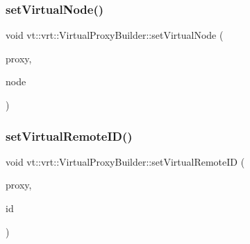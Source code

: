 \mbox{\label{structvt_1_1vrt_1_1_virtual_proxy_builder_a9d86ac5516ac3617501680ce2c6e28c0}} 
\subsubsection{\texorpdfstring{set\+Virtual\+Node()}{setVirtualNode()}}
{\footnotesize\ttfamily void vt\+::vrt\+::\+Virtual\+Proxy\+Builder\+::set\+Virtual\+Node (\begin{DoxyParamCaption}\item[{\hyperlink{namespacevt_a1b417dd5d684f045bb58a0ede70045ac}{Virtual\+Proxy\+Type} \&}]{proxy,  }\item[{\hyperlink{namespacevt_a866da9d0efc19c0a1ce79e9e492f47e2}{Node\+Type} const \&}]{node }\end{DoxyParamCaption})\hspace{0.3cm}{\ttfamily [static]}}

\mbox{\label{structvt_1_1vrt_1_1_virtual_proxy_builder_a531eb058c08a809d6266533e4ed597ba}} 
\subsubsection{\texorpdfstring{set\+Virtual\+Remote\+I\+D()}{setVirtualRemoteID()}}
{\footnotesize\ttfamily void vt\+::vrt\+::\+Virtual\+Proxy\+Builder\+::set\+Virtual\+Remote\+ID (\begin{DoxyParamCaption}\item[{\hyperlink{namespacevt_a1b417dd5d684f045bb58a0ede70045ac}{Virtual\+Proxy\+Type} \&}]{proxy,  }\item[{\hyperlink{namespacevt_1_1vrt_a8184ab8c530ce523edcdc4f4c38565be}{Virtual\+Remote\+I\+D\+Type} const \&}]{id }\end{DoxyParamCaption})\hspace{0.3cm}{\ttfamily [static]}}

